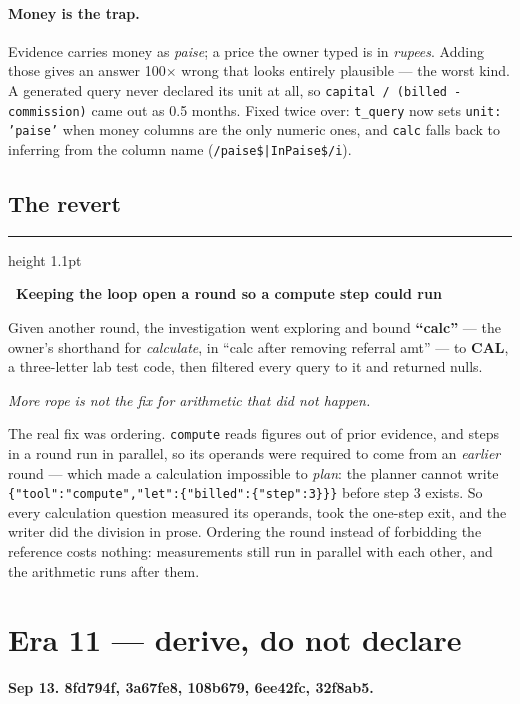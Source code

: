 \documentclass[11pt,a4paper]{report}
\newcommand{\code}[1]{\texttt{\small #1}}
\newcommand{\sha}[1]{{\ttfamily\small\color{slate}#1}}
\newenvironment{keybox}[1]
 {\par\medskip\begin{center}\begin{minipage}{0.94\textwidth}%
  {\color{navy}\hrule height 1.1pt}\vspace{5pt}\par
  \textbf{\color{navy}#1}\par\vspace{3pt}\small}
 {\par\vspace{5pt}{\color{mist}\hrule height 0.8pt}\end{minipage}\end{center}\medskip}
\newcommand{\verdictR}{{\color{amber}\textbf{REVERTED}}}
\begin{document}
\paragraph{Money is the trap.} Evidence carries money as \emph{paise}; a price the owner typed is
in \emph{rupees}. Adding those gives an answer 100$\times$ wrong that looks entirely plausible ---
the worst kind. A generated query never declared its unit at all, so \code{capital / (billed -
commission)} came out as 0.5 months. Fixed twice over: \code{t\_query} now sets
\code{unit: 'paise'} when money columns are the only numeric ones, and \code{calc} falls back to
inferring from the column name (\code{/paise\$|InPaise\$/i}).

\subsection{The revert}

\begin{keybox}{\verdictR\ Keeping the loop open a round so a compute step could run}
Given another round, the investigation went exploring and bound \textbf{``calc''} --- the owner's
shorthand for \emph{calculate}, in ``calc after removing referral amt'' --- to \textbf{CAL}, a
three-letter lab test code, then filtered every query to it and returned nulls.

\emph{More rope is not the fix for arithmetic that did not happen.}
\end{keybox}

\noindent The real fix was ordering. \code{compute} reads figures out of prior evidence, and steps
in a round run in parallel, so its operands were required to come from an \emph{earlier} round ---
which made a calculation impossible to \emph{plan}: the planner cannot write
\code{\{"tool":"compute","let":\{"billed":\{"step":3\}\}\}} before step 3 exists. So every
calculation question measured its operands, took the one-step exit, and the writer did the division
in prose. Ordering the round instead of forbidding the reference costs nothing: measurements still
run in parallel with each other, and the arithmetic runs after them.

\section{Era 11 --- derive, do not declare}
\label{sec:era11}

\textbf{Sep 13. \sha{8fd794f}, \sha{3a67fe8}, \sha{108b679}, \sha{6ee42fc}, \sha{32f8ab5}.}
\end{document}
